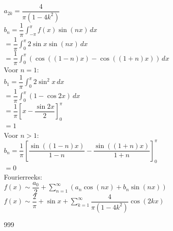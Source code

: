 \documentclass[a4paper]{article}
\begin{document}
$ a_{2k} = \dfrac{4}{\pi(1-4k^2)}$\\

$ b_n = \dfrac{1}{\pi}\displaystyle\int_{-\pi}^{\pi} f(x)\sin(nx)\,dx$\\

$ = \dfrac{1}{\pi}\displaystyle\int_0^{\pi} 2\sin x \sin(nx)\,dx$\\

$ = \dfrac{1}{\pi}\displaystyle\int_0^{\pi}
\left(\cos((1-n)x)-\cos((1+n)x)\right)\,dx$\\

Voor $n=1$:\\

$ b_1 = \dfrac{1}{\pi}\displaystyle\int_0^{\pi}2\sin^2x\,dx$\\

$ = \dfrac{1}{\pi}\displaystyle\int_0^{\pi}(1-\cos 2x)\,dx$\\

$ = \dfrac{1}{\pi}\left[x-\dfrac{\sin 2x}{2}\right]_0^{\pi}$\\

$ = 1$\\

Voor $n>1$:\\

$ b_n =
\dfrac{1}{\pi}
\left[
\dfrac{\sin((1-n)x)}{1-n}
-
\dfrac{\sin((1+n)x)}{1+n}
\right]_0^{\pi}$\\

$ = 0$\\

Fourierreeks:\\

$ f(x) \sim \dfrac{a_0}{2} + \displaystyle\sum_{n=1}^{\infty}
\left(a_n\cos(nx)+b_n\sin(nx)\right)$\\

$ f(x) \sim \dfrac{2}{\pi} + \sin x +
\displaystyle\sum_{k=1}^{\infty}
\dfrac{4}{\pi(1-4k^2)}\cos(2kx)$\\

\begin{thebibliography}{999}
\end{thebibliography}
\end{document}
